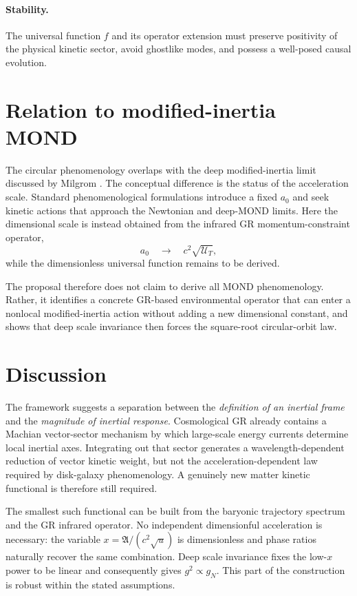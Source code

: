 \documentclass[11pt]{article}
\newcommand{\UT}{\mathcal{U}_{T}}
\newcommand{\Arel}{\mathfrak{A}}
\begin{document}
\paragraph{Stability.}
The universal function $f$ and its operator extension must preserve positivity of the physical kinetic sector, avoid ghostlike modes, and possess a well-posed causal evolution.

\section{Relation to modified-inertia MOND}

The circular phenomenology overlaps with the deep modified-inertia limit discussed by Milgrom \cite{Milgrom1994}. The conceptual difference is the status of the acceleration scale. Standard phenomenological formulations introduce a fixed $a_0$ and seek kinetic actions that approach the Newtonian and deep-MOND limits. Here the dimensional scale is instead obtained from the infrared GR momentum-constraint operator,
\begin{equation}
    a_0\quad\longrightarrow\quad c^2\sqrt{\UT},
\end{equation}
while the dimensionless universal function remains to be derived.

The proposal therefore does not claim to derive all MOND phenomenology. Rather, it identifies a concrete GR-based environmental operator that can enter a nonlocal modified-inertia action without adding a new dimensional constant, and shows that deep scale invariance then forces the square-root circular-orbit law.

\section{Discussion}

The framework suggests a separation between the \emph{definition of an inertial frame} and the \emph{magnitude of inertial response}. Cosmological GR already contains a Machian vector-sector mechanism by which large-scale energy currents determine local inertial axes. Integrating out that sector generates a wavelength-dependent reduction of vector kinetic weight, but not the acceleration-dependent law required by disk-galaxy phenomenology. A genuinely new matter kinetic functional is therefore still required.

The smallest such functional can be built from the baryonic trajectory spectrum and the GR infrared operator. No independent dimensionful acceleration is necessary: the variable $x=\Arel/(c^2\sqrt u)$ is dimensionless and phase ratios naturally recover the same combination. Deep scale invariance fixes the low-$x$ power to be linear and consequently gives $g^2\propto g_N$. This part of the construction is robust within the stated assumptions.
\end{document}
